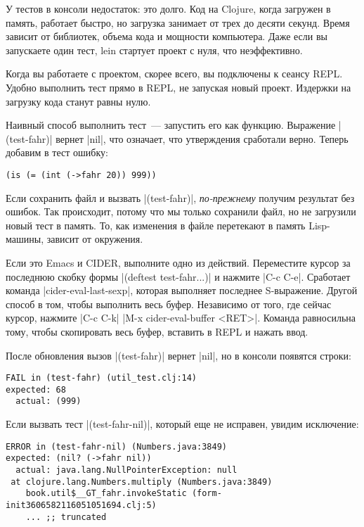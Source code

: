 У тестов в консоли недостаток: это долго. Код на Clojure, когда загружен в
память, работает быстро, но загрузка занимает от трех до десяти секунд. Время
зависит от библиотек, объема кода и мощности компьютера. Даже если вы запускаете
один тест, lein стартует проект с нуля, что неэффективно.

Когда вы работаете с проектом, скорее всего, вы подключены к сеансу REPL. Удобно
выполнить тест прямо в REPL, не запуская новый проект. Издержки на загрузку кода
станут равны нулю.

Наивный способ выполнить тест~--- запустить его как функцию. Выражение
\spverb|(test-fahr)| вернет \spverb|nil|, что означает, что утверждения
сработали верно. Теперь добавим в тест ошибку:

\begin{verbatim}
(is (= (int (->fahr 20)) 999))
\end{verbatim}

Если сохранить файл и вызвать \spverb|(test-fahr)|, \emph{по-прежнему} получим
результат без ошибок. Так происходит, потому что мы только сохранили файл, но не
загрузили новый тест в память. То, как изменения в файле перетекают в память
Lisp-машины, зависит от окружения.

Если это Emacs и CIDER, выполните одно из действий. Переместите курсор за
последнюю скобку формы \spverb|(deftest test-fahr...)| и нажмите \spverb|C-c C-e|.
Сработает команда \spverb|cider-eval-last-sexp|, которая выполняет последнее
S-выражение. Другой способ в том, чтобы выполнить весь буфер. Независимо от
того, где сейчас курсор, нажмите \spverb|C-c C-k| \spverb|M-x cider-eval-buffer <RET>|.
Команда равносильна тому, чтобы скопировать весь буфер, вставить в REPL и нажать ввод.

После обновления вызов \spverb|(test-fahr)| вернет \spverb|nil|, но в консоли появятся строки:

\begin{verbatim}
FAIL in (test-fahr) (util_test.clj:14)
expected: 68
  actual: (999)
\end{verbatim}

Если вызвать тест \spverb|(test-fahr-nil)|, который еще не исправен, увидим
исключение:

\begin{verbatim}
ERROR in (test-fahr-nil) (Numbers.java:3849)
expected: (nil? (->fahr nil))
  actual: java.lang.NullPointerException: null
 at clojure.lang.Numbers.multiply (Numbers.java:3849)
    book.util$__GT_fahr.invokeStatic (form-init3606582116051051694.clj:5)
    ... ;; truncated
\end{verbatim}

